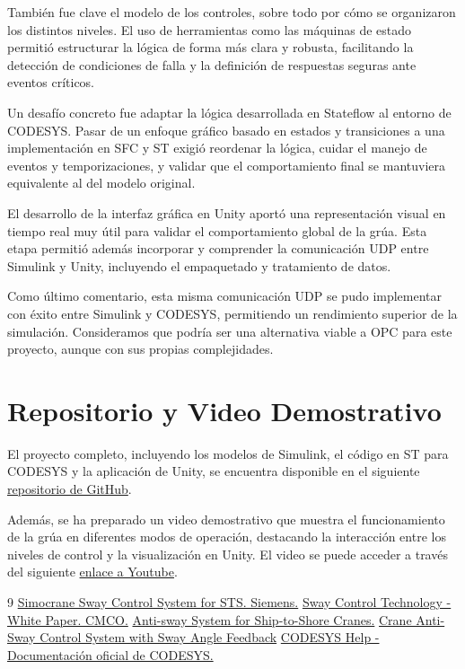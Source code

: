 \documentclass[11pt]{article}                                    %
\begin{document}
También fue clave el modelo de los controles, sobre todo por cómo se organizaron los distintos niveles. El uso de herramientas como las máquinas de estado permitió estructurar la lógica de forma más clara y robusta, facilitando la detección de condiciones de falla y la definición de respuestas seguras ante eventos críticos.

Un desafío concreto fue adaptar la lógica desarrollada en Stateflow al entorno de CODESYS. Pasar de un enfoque gráfico basado en estados y transiciones a una implementación en SFC y ST exigió reordenar la lógica, cuidar el manejo de eventos y temporizaciones, y validar que el comportamiento final se mantuviera equivalente al del modelo original.

El desarrollo de la interfaz gráfica en Unity aportó una representación visual en tiempo real muy útil para validar el comportamiento global de la grúa. Esta etapa permitió además incorporar y comprender la comunicación UDP entre Simulink y Unity, incluyendo el empaquetado y tratamiento de datos. 

Como último comentario, esta misma comunicación UDP se pudo implementar con éxito entre Simulink y CODESYS, permitiendo un rendimiento superior de la simulación. Consideramos que podría ser una alternativa viable a OPC para este proyecto, aunque con sus propias complejidades.

\section{Repositorio y Video Demostrativo}
El proyecto completo, incluyendo los modelos de Simulink, el código en ST para CODESYS y la aplicación de Unity, se encuentra disponible en el siguiente \href{https://github.com/nahuelpucciarelli/AyCD-Proyecto.git}{repositorio de GitHub}.

Además, se ha preparado un video demostrativo que muestra el funcionamiento de la grúa en diferentes modos de operación, destacando la interacción entre los niveles de control y la visualización en Unity. El video se puede acceder a través del siguiente \href{https://youtu.be/EwhYYALPttk?si=lQyfEXJ0O0OWh1-4}{enlace a Youtube}.

\newpage
\begin{thebibliography}{9}
 \href{https://assets.new.siemens.com/siemens/assets/api/uuid:e50a2d23-95fc-401a-8f4b-a6aec736a100/simocrane-sway-control-system-for-sts.pdf}{Simocrane Sway Control System for STS. Siemens.}
 \href{https://www.cmco.com/globalassets/case-studies/sway-control-technology/swaycontrolwhitepaper.pdf}{Sway Control Technology - White Paper. CMCO.}
 \href{https://sci-hub.st/10.5545/sv-jme.2010.127}{Anti-sway System for Ship-to-Shore Cranes.}
 \href{https://sci-hub.st/10.1109/ICIEAM.2018.8728750}{Crane Anti-Sway Control System with Sway Angle Feedback}
 \href{https://www.helpme-codesys.com/}{CODESYS Help - Documentación oficial de CODESYS.}
\end{thebibliography}
\end{document}
